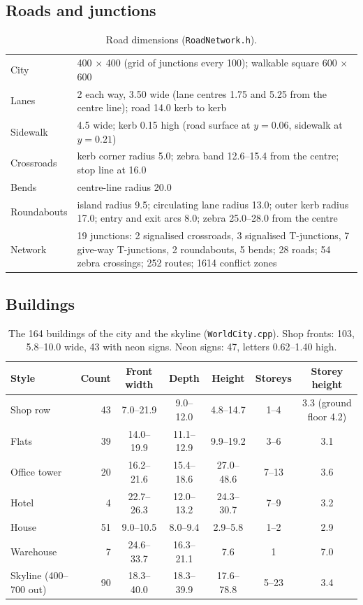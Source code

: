 \documentclass[11pt,a4paper]{article}
\newcommand{\code}[1]{\texttt{\small #1}}
\begin{document}
\subsection{Roads and junctions}
\begin{table}[H]
\centering\small
\begin{tabularx}{\textwidth}{@{}l X@{}}
\toprule
City & 400 $\times$ 400 (grid of junctions every 100); walkable square 600 $\times$ 600 \\
Lanes & 2 each way, 3.50 wide (lane centres 1.75 and 5.25 from the centre line); road 14.0 kerb to kerb \\
Sidewalk & 4.5 wide; kerb 0.15 high (road surface at $y = 0.06$, sidewalk at $y = 0.21$) \\
Crossroads & kerb corner radius 5.0; zebra band 12.6--15.4 from the centre; stop line at 16.0 \\
Bends & centre-line radius 20.0 \\
Roundabouts & island radius 9.5; circulating lane radius 13.0; outer kerb radius 17.0; entry and exit arcs 8.0; zebra 25.0--28.0 from the centre \\
Network & 19 junctions: 2 signalised crossroads, 3 signalised T-junctions, 7 give-way T-junctions, 2 roundabouts, 5 bends; 28 roads; 54 zebra crossings; 252 routes; 1614 conflict zones \\
\bottomrule
\end{tabularx}
\caption{Road dimensions (\code{RoadNetwork.h}).}
\end{table}

\subsection{Buildings}
\begin{table}[H]
\centering\small
\begin{tabular}{@{}lrccccc@{}}
\toprule
Style & Count & Front width & Depth & Height & Storeys & Storey height\\ \midrule
Shop row & 43 & 7.0--21.9 & 9.0--12.0 & 4.8--14.7 & 1--4 & 3.3 (ground floor 4.2)\\
Flats & 39 & 14.0--19.9 & 11.1--12.9 & 9.9--19.2 & 3--6 & 3.1\\
Office tower & 20 & 16.2--21.6 & 15.4--18.6 & 27.0--48.6 & 7--13 & 3.6\\
Hotel & 4 & 22.7--26.3 & 12.0--13.2 & 24.3--30.7 & 7--9 & 3.2\\
House & 51 & 9.0--10.5 & 8.0--9.4 & 2.9--5.8 & 1--2 & 2.9\\
Warehouse & 7 & 24.6--33.7 & 16.3--21.1 & 7.6 & 1 & 7.0\\ \midrule
Skyline (400--700 out) & 90 & 18.3--40.0 & 18.3--39.9 & 17.6--78.8 & 5--23 & 3.4\\
\bottomrule
\end{tabular}
\caption{The 164 buildings of the city and the skyline (\code{WorldCity.cpp}). Shop fronts: 103, 5.8--10.0 wide, 43 with neon signs. Neon signs: 47, letters 0.62--1.40 high.}
\end{table}
\end{document}
